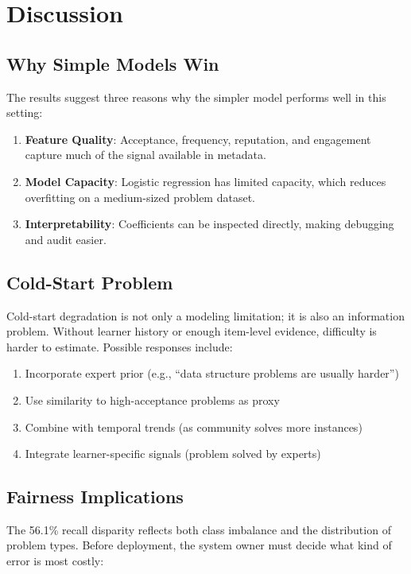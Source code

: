 \documentclass[conference]{IEEEtran}
\begin{document}
\section{Discussion}

\subsection{Why Simple Models Win}

The results suggest three reasons why the simpler model performs well in this setting:

\begin{enumerate}
    \item \textbf{Feature Quality}: Acceptance, frequency, reputation, and engagement capture much of the signal available in metadata.
    \item \textbf{Model Capacity}: Logistic regression has limited capacity, which reduces overfitting on a medium-sized problem dataset.
    \item \textbf{Interpretability}: Coefficients can be inspected directly, making debugging and audit easier.
\end{enumerate}

\subsection{Cold-Start Problem}

Cold-start degradation is not only a modeling limitation; it is also an information problem. Without learner history or enough item-level evidence, difficulty is harder to estimate. Possible responses include:

\begin{enumerate}
    \item Incorporate expert prior (e.g., ``data structure problems are usually harder'')
    \item Use similarity to high-acceptance problems as proxy
    \item Combine with temporal trends (as community solves more instances)
    \item Integrate learner-specific signals (problem solved by experts)
\end{enumerate}

\subsection{Fairness Implications}

The 56.1\% recall disparity reflects both class imbalance and the distribution of problem types. Before deployment, the system owner must decide what kind of error is most costly:
\end{document}
